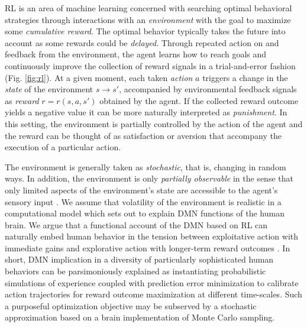 \documentclass[10pt,letterpaper]{article}
\begin{document}
RL is an area of machine learning concerned with searching optimal behavioral strategies through interactions
with an \textit{environment} with the goal to maximize some \textit{cumulative reward}.
The optimal behavior typically
takes the future into account as some rewards could be \textit{delayed}.
Through repeated action on and feedback from the environment,
the agent learns how to reach goals and continuously improve the collection of reward signals
in a trial-and-error fashion (Fig. \ref{fig:rl}).
At a given moment, each taken \textit{action} $a$ triggers a change
in the \textit{state} of the environment
$s \rightarrow s'$, accompanied by environmental feedback signals as \textit{reward}
$r = r(s, a,s')$ obtained by the agent.
If the collected reward outcome yields a negative value it can be
more naturally interpreted as \textit{punishment}.
In this setting, the environment is partially controlled by
the action of the agent and the reward can be thought
of as satisfaction \textemdash or aversion \textemdash that accompany the execution of
a particular action.



The environment is generally taken as \textit{stochastic},
that is, changing in random ways. In addition, the environment is only
\textit{partially observable} in the sense that only limited aspects of the environment's
state are accessible to the agent's sensory input
\citep{starkweather2017dopamine}.
We assume that volatility of the environment
is realistic in a computational model which sets out
to explain DMN functions of the human brain.
We argue that a functional account of the DMN based on RL
can naturally embed human behavior
in the tension between exploitative action with immediate gains and
explorative action with longer-term reward outcomes
\citep{dayan2008decision}.
In short, DMN implication in a diversity of
particularly sophisticated human behaviors
can be parsimoniously explained as instantiating probabilistic
simulations of experience coupled with prediction error minimization
to calibrate action trajectories for
reward outcome maximization at different time-scales.
Such a purposeful optimization objective
may be subserved by a stochastic approximation
based on a brain implementation of Monte Carlo sampling.
\end{document}
